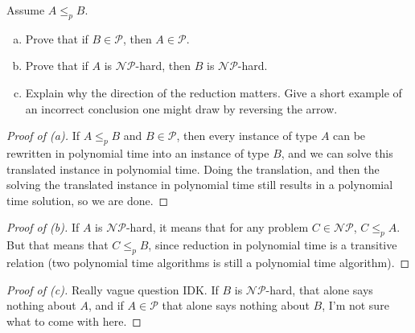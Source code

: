 \documentclass[11pt,a4paper]{article}
\begin{document}
\begin{assignment}
 Assume $A \leq_{p} B$.
\begin{enumerate}[(a)]
 \item Prove that if $B \in \mathcal{P}$, then $A \in  \mathcal{P}$.
 \item Prove that if $A$ is $\mathcal{NP}$-hard, then $B $ is $\mathcal{NP}$-hard.
 \item Explain why the direction of the reduction matters. Give a short example of an incorrect conclusion one might draw by reversing the arrow.
\end{enumerate}
\begin{proof}[Proof of (a)]
 If $A \leq_{p} B$ and $B \in \mathcal{P}$, then every instance of type $A$ can be rewritten in polynomial time into an instance of type $B$, and we can solve this translated instance in polynomial time.  Doing the translation, and then the solving the translated instance in polynomial time still results in a polynomial time solution, so we are done.
\end{proof}

\begin{proof}[Proof of (b)]
If $A$ is $\mathcal{NP}$-hard, it means that for any problem $C \in \mathcal{NP}$, 
$C \leq_{p} A$. But that means that $C \leq_{p} B$, since reduction in polynomial time is a transitive relation (two polynomial time algorithms is still a polynomial time algorithm). 
\end{proof}

\begin{proof}[Proof of (c)]
Really vague question IDK. If $B$ is $\mathcal{NP}$-hard, that alone says nothing about $A$, and if $A \in  \mathcal{P}$ that alone says nothing about $B$, I'm not sure what to come with here. 
\end{proof}
\end{assignment}
\end{document}
